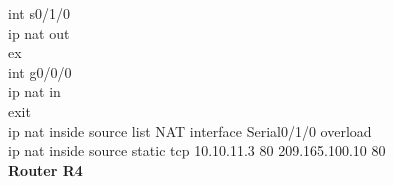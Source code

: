 \documentclass[a4paper, 12pt]{article}
\begin{document}
{\hspace*{2cm}int s0/1/0\\
\hspace*{2cm}ip nat out\\
\hspace*{2cm}ex\\
\hspace*{2cm}int g0/0/0\\
\hspace*{2cm}ip nat in\\
\hspace*{2cm}exit\\
\hspace*{2cm}ip nat inside source list NAT interface Serial0/1/0 overload\\
\hspace*{2cm}ip nat inside source static tcp 10.10.11.3 80 209.165.100.10 80\\}
\hspace*{1cm}\textbf{Router R4}	\\
\end{document}
